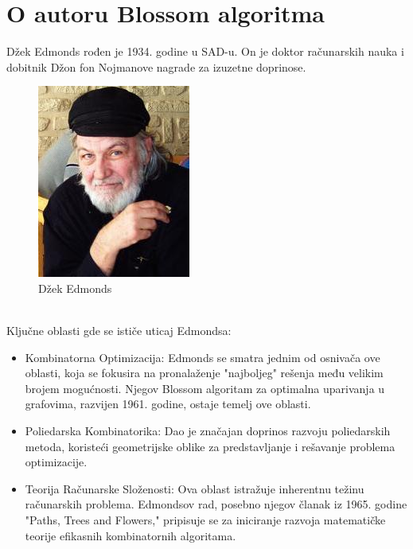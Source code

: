 \documentclass[11pt,a4paper]{article}
\theoremstyle{definition}
\begin{document}
\section{O autoru Blossom algoritma}
Džek Edmonds rođen je 1934. godine u SAD-u. On je doktor računarskih nauka i dobitnik Džon fon Nojmanove nagrade za izuzetne doprinose.
\begin{figure}[ht]
\begin{center}
\includegraphics[scale=0.4]{jack_edmonds.jpg}
\end{center}
\caption{Džek Edmonds}
\label{fig:slika 6}
\end{figure}
\\Ključne oblasti gde se ističe uticaj Edmondsa:
\begin{itemize}
\item Kombinatorna Optimizacija: Edmonds se smatra jednim od osnivača ove oblasti, koja se fokusira na pronalaženje "najboljeg" rešenja među velikim brojem mogućnosti. Njegov Blossom algoritam za optimalna uparivanja u grafovima, razvijen 1961. godine, ostaje temelj ove oblasti.

\item Poliedarska Kombinatorika: Dao je značajan doprinos razvoju poliedarskih metoda, koristeći geometrijske oblike za predstavljanje i rešavanje problema optimizacije.

\item  Teorija Računarske Složenosti: Ova oblast istražuje inherentnu težinu računarskih problema. Edmondsov rad, posebno njegov članak iz 1965. godine "Paths, Trees and Flowers," pripisuje se za iniciranje razvoja matematičke teorije efikasnih kombinatornih algoritama.
\end{itemize}
\end{document}
